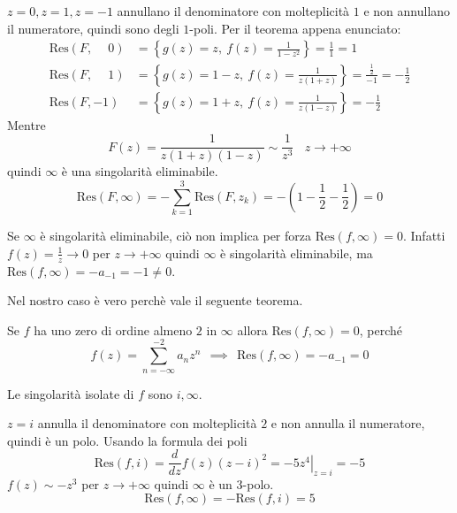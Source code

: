 $z=0,z=1,z=-1$ annullano il denominatore con molteplicità $1$ e non annullano il numeratore, quindi sono degli $1$-poli. Per il teorema appena enunciato:
\begin{align*}
\mathrm{Res}\left( F,\phantom{-}0\right) &=\left\{g\left( z\right) =  z,\ f\left( z\right) =\frac{1}{1-z^{2}}\right\} =\frac{1}{1} =1\\
\mathrm{Res}\left( F,\phantom{-}1\right) &=\left\{g\left( z\right) =1-z,\ f\left( z\right) =\frac{1}{z\left( 1+z\right)}\right\} =\frac{\frac{1}{2}}{-1} =-\frac{1}{2}\\
\mathrm{Res}\left( F,-1\right) 			 &=\left\{g\left( z\right) =1+z,\ f\left( z\right) =\frac{1}{z\left( 1-z\right)}\right\} =-\frac{1}{2}
\end{align*}
Mentre
\begin{equation*}
F\left( z\right) =\frac{1}{z\left( 1+z\right)\left( 1-z\right)} \sim \frac{1}{z^{3}} \ \ \ \ z\rightarrow +\infty 
\end{equation*}
quindi $\infty $ è una singolarità eliminabile.
\begin{equation*}
\mathrm{Res}\left( F,\infty \right) =-\sum\limits ^{3}_{k=1}\mathrm{Res}\left( F,z_{k}\right) =-\left( 1-\frac{1}{2} -\frac{1}{2}\right) =0
\end{equation*}
\begin{rem}
Se $\infty $ è singolarità eliminabile, ciò non implica per forza $\mathrm{Res}\left( f,\infty \right) =0$. Infatti $f\left( z\right) =\frac{1}{z}\rightarrow 0$ per $z\rightarrow +\infty $ quindi $\infty $ è singolarità eliminabile, ma $\mathrm{Res}\left( f,\infty \right) =-a_{-1} =-1\neq 0$.
\end{rem}
\begin{rem}
Nel nostro caso è vero perchè vale il seguente teorema.
\end{rem}
\begin{thm}
Se $f$ ha uno zero di ordine almeno $2$ in $\infty $ allora $\mathrm{Res}\left( f,\infty \right) =0$, perché
\begin{equation*}
f\left( z\right) =\sum\limits ^{-2}_{n=-\infty } a_{n} z^{n} \ \ \implies \ \ \mathrm{Res}\left( f,\infty \right) =-a_{-1} =0
\end{equation*}
\end{thm}
\Soluzione

Le singolarità isolate di $f$ sono $i,\infty $.

$z=i$ annulla il denominatore con molteplicità $2$ e non annulla il numeratore, quindi è un polo. Usando la formula dei poli
\begin{equation*}
\mathrm{Res}\left( f,i\right) =\frac{d}{dz} f\left( z\right)\left( z-i\right)^{2} =\left. -5z^{4}\right| _{z=i} =-5
\end{equation*}
$f\left( z\right) \sim -z^{3}$ per $z\rightarrow +\infty $ quindi $\infty $ è un $3$-polo.
\begin{equation*}
\mathrm{Res}\left( f,\infty \right) =-\mathrm{Res}\left( f,i\right) =5
\end{equation*}
\Soluzione

